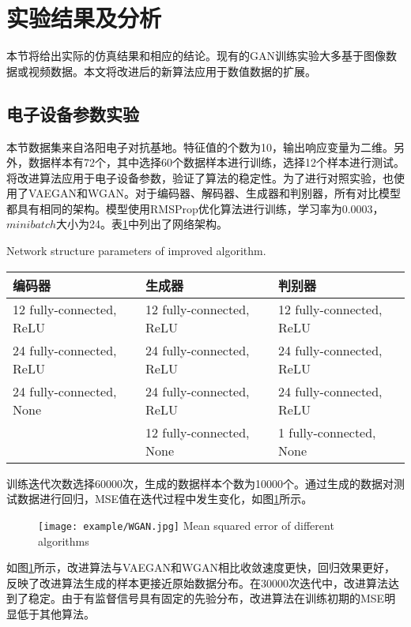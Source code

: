 \section{实验结果及分析}
本节将给出实际的仿真结果和相应的结论。现有的GAN训练实验大多基于图像数据或视频数据。本文将改进后的新算法应用于数值数据的扩展。

\subsection{电子设备参数实验}

本节数据集来自洛阳电子对抗基地。特征值的个数为10，输出响应变量为二维。另外，数据样本有72个，其中选择60个数据样本进行训练，选择12个样本进行测试。将改进算法应用于电子设备参数，验证了算法的稳定性。为了进行对照实验，也使用了VAEGAN和WGAN。对于编码器、解码器、生成器和判别器，所有对比模型都具有相同的架构。模型使用RMSProp优化算法进行训练，学习率为0.0003，$minibatch$大小为24。表\ref{tab3}中列出了网络架构。

\begin{table}[htpb]
	\centering
	{Network structure parameters of improved algorithm.}
	\label{tab3}
	\begin{tabular}{lll} \toprule
		编码器   & 生成器 & 判别器  \\  \midrule
		12 fully-connected, ReLU &12 fully-connected, ReLU&12 fully-connected, ReLU\\
		24 fully-connected, ReLU&24 fully-connected, ReLU&24 fully-connected, ReLU\\
		24 fully-connected, None&24 fully-connected, ReLU&24 fully-connected, ReLU\\
		&12 fully-connected, None&1 fully-connected, None\\ \bottomrule
	\end{tabular}
\end{table}

训练迭代次数选择60000次，生成的数据样本个数为10000个。通过生成的数据对测试数据进行回归，MSE值在迭代过程中发生变化，如图\ref{fig3}所示。

\begin{figure}[htpb]
	\centering
	\texttt{[image: example/WGAN.jpg]}
	{Mean squared error of different algorithms}
	\label{fig3}
\end{figure}

如图\ref{fig3}所示，改进算法与VAEGAN和WGAN相比收敛速度更快，回归效果更好，反映了改进算法生成的样本更接近原始数据分布。在30000次迭代中，改进算法达到了稳定。由于有监督信号具有固定的先验分布，改进算法在训练初期的MSE明显低于其他算法。

